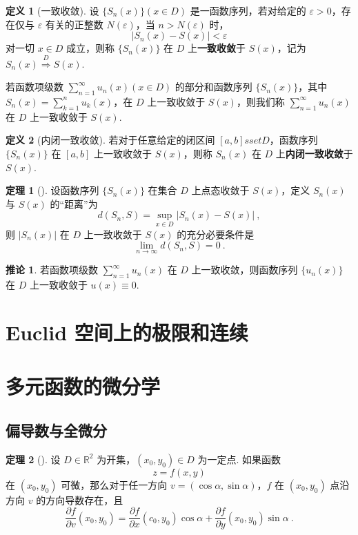 \documentclass[zihao=-4,linespread=1.8,UTF8,nothm]{aytony_base}
\theoremstyle{definition}
\newtheorem{theorem}{\indent\heiti\textbf{定理}}[subsection]
\newtheorem*{corollary}{\indent\heiti\textbf{推论}}
\newtheorem{definition}{\indent\heiti\textbf{定义}}[subsection]
\begin{document}
\begin{definition}[一致收敛]
    设 $\{S_n(x)\}(x \in D)$ 是一函数序列，若对给定的 $\varepsilon > 0$，存在仅与 $\varepsilon$ 有关的正整数 $N(\varepsilon)$，当 $n > N(\varepsilon)$ 时，$$
        |S_n(x) - S(x)| < \varepsilon
    $$ 对一切 $x \in D$ 成立，则称 $\{S_n(x)\}$ 在 $D$ 上\textbf{一致收敛}于 $S(x)$，记为 $S_n(x) \overset{D}{\Rightarrow} S(x)$.

    若函数项级数 $\sum\limits_{n = 1}^{\infty}u_n(x)(x \in D)$ 的部分和函数序列 $\{S_n(x)\}$，其中 $S_n(x) = \sum\limits_{k = 1}^{n}u_k(x)$，在 $D$ 上一致收敛于 $S(x)$，则我们称 $\sum\limits_{n = 1}^{\infty}u_n(x)$ 在 $D$ 上一致收敛于 $S(x)$.
\end{definition}

\begin{definition}[内闭一致收敛]
    若对于任意给定的闭区间 $[a, b] sset D$，函数序列 $\{S_n(x)\}$ 在 $[a, b]$ 上一致收敛于 $S(x)$，则称 $S_n(x)$ 在 $D$ 上\textbf{内闭一致收敛}于 $S(x)$.
\end{definition}

\begin{theorem}[]
    设函数序列 $\{S_n(x)\}$ 在集合 $D$ 上点态收敛于 $S(x)$，定义 $S_n(x)$ 与 $S(x)$ 的“距离”为 $$
        d(S_n, S) = \sup_{x \in D}|S_n(x) - S(x)|\ ,
    $$ 则 $|S_n(x)|$ 在 $D$ 上一致收敛于 $S(x)$ 的充分必要条件是 $$
        \lim\limits_{n \to \infty} d(S_n, S) = 0\ .
    $$
\end{theorem}

\begin{corollary}
    若函数项级数 $\sum\limits_{n = 1}^{\infty}u_n(x)$ 在 $D$ 上一致收敛，则函数序列 $\{u_n(x)\}$ 在 $D$ 上一致收敛于 $u(x)\equiv 0$.
\end{corollary}

\section{Euclid 空间上的极限和连续}

\section{多元函数的微分学}

\subsection{偏导数与全微分}

\begin{theorem}[]
    设 $D \in \mathbb{R}^2$ 为开集，$(x_0, y_0) \in D$ 为一定点. 如果函数 $$
        z = f(x, y)
    $$ 在 $(x_0, y_0)$ 可微，那么对于任一方向 $v = (\cos \alpha, \sin \alpha)$，$f$ 在 $(x_0, y_0)$ 点沿方向 $v$ 的方向导数存在，且 $$
        \dfrac{\partial f}{\partial v} (x_0, y_0) = \dfrac{\partial f}{\partial x}(c_0, y_0) \cos \alpha + \dfrac{\partial f}{\partial y}(x_0, y_0) \sin \alpha\ .
    $$
\end{theorem}
\end{document}
